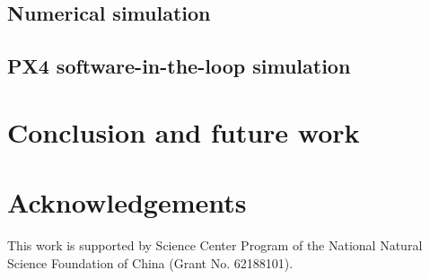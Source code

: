 \documentclass[5p,authoryear,preprint]{elsarticle}\linenofalse
\begin{document}
\subsection{Numerical simulation}



\subsection{PX4 software-in-the-loop simulation}

%




\section{Conclusion and future work}











\section{Acknowledgements}
This work is supported by
Science Center Program of the National Natural
Science Foundation of China (Grant No. 62188101).



 

\end{document}
